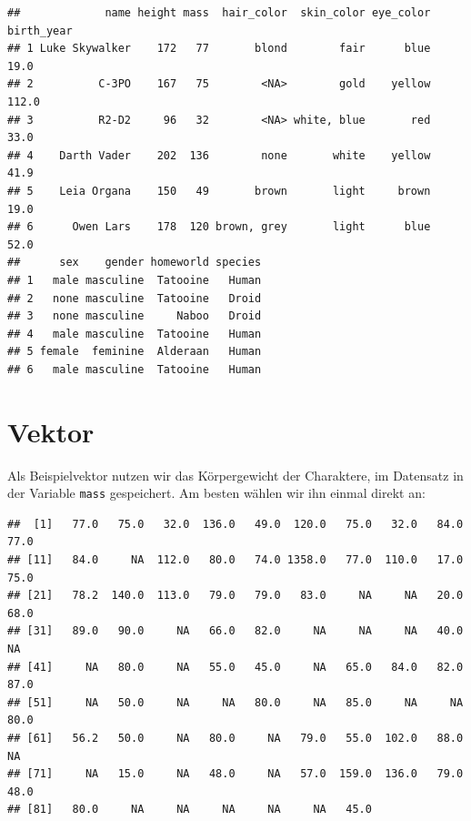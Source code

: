 \documentclass[
]{book}
\newenvironment{Shaded}{\begin{snugshade}}{\end{snugshade}}
\newcommand{\NormalTok}[1]{#1}
\newcommand{\OtherTok}[1]{\textcolor[rgb]{0.56,0.35,0.01}{#1}}
\newcommand{\SpecialCharTok}[1]{\textcolor[rgb]{0.00,0.00,0.00}{#1}}
\begin{document}
\begin{verbatim}
##             name height mass  hair_color  skin_color eye_color birth_year
## 1 Luke Skywalker    172   77       blond        fair      blue       19.0
## 2          C-3PO    167   75        <NA>        gold    yellow      112.0
## 3          R2-D2     96   32        <NA> white, blue       red       33.0
## 4    Darth Vader    202  136        none       white    yellow       41.9
## 5    Leia Organa    150   49       brown       light     brown       19.0
## 6      Owen Lars    178  120 brown, grey       light      blue       52.0
##      sex    gender homeworld species
## 1   male masculine  Tatooine   Human
## 2   none masculine  Tatooine   Droid
## 3   none masculine     Naboo   Droid
## 4   male masculine  Tatooine   Human
## 5 female  feminine  Alderaan   Human
## 6   male masculine  Tatooine   Human
\end{verbatim}

\hypertarget{vektor-1}{%
\section{Vektor}\label{vektor-1}}

Als Beispielvektor nutzen wir das Körpergewicht der Charaktere, im Datensatz in der Variable \texttt{mass} gespeichert. Am besten wählen wir ihn einmal direkt an:

\begin{Shaded}
\end{Shaded}

\begin{verbatim}
##  [1]   77.0   75.0   32.0  136.0   49.0  120.0   75.0   32.0   84.0   77.0
## [11]   84.0     NA  112.0   80.0   74.0 1358.0   77.0  110.0   17.0   75.0
## [21]   78.2  140.0  113.0   79.0   79.0   83.0     NA     NA   20.0   68.0
## [31]   89.0   90.0     NA   66.0   82.0     NA     NA     NA   40.0     NA
## [41]     NA   80.0     NA   55.0   45.0     NA   65.0   84.0   82.0   87.0
## [51]     NA   50.0     NA     NA   80.0     NA   85.0     NA     NA   80.0
## [61]   56.2   50.0     NA   80.0     NA   79.0   55.0  102.0   88.0     NA
## [71]     NA   15.0     NA   48.0     NA   57.0  159.0  136.0   79.0   48.0
## [81]   80.0     NA     NA     NA     NA     NA   45.0
\end{verbatim}
\end{document}
